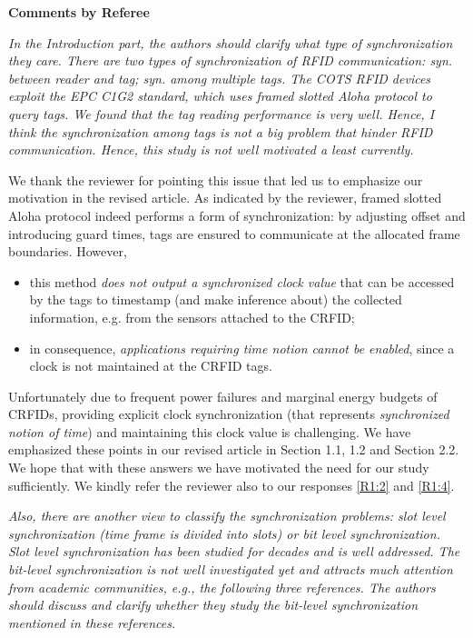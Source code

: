 \documentclass[10pt]{article}
\newcommand{\referee}[1]{
	{\item \color{OliveGreen} \emph{{#1}}}
	\label{R\therefereeCounter:\arabic{enumi}}
}
\newcommand{\response}[1]{{\color{blue} #1}}
\newcounter{refereeCounter}
\newenvironment{responses}{%
\refstepcounter{refereeCounter}%
\textbf{\large Comments by Referee \therefereeCounter}
\begin{enumerate}%
\renewcommand{\labelenumi}{\textbf{[R\therefereeCounter :\,\arabic{enumi}]}} %
}{\end{enumerate}}
\begin{document}
\begin{responses}
 
\referee{In the Introduction part, the authors should clarify what type of synchronization they care. There are two types of synchronization of RFID communication: syn. between reader and tag; syn. among multiple tags. The COTS RFID devices exploit the EPC C1G2 standard, which uses framed slotted Aloha protocol to query tags. We found that the tag reading performance is very well. Hence, I think the synchronization among tags is not a big problem that hinder RFID communication. Hence, this study is not well motivated a least currently.}

\response{We thank the reviewer for pointing this issue that led us to emphasize our motivation in the revised article. As indicated by the reviewer, framed slotted Aloha protocol indeed performs a form of synchronization: by adjusting offset and introducing guard times, tags are ensured to communicate at the allocated frame boundaries. However, 

\begin{itemize}
	\item this method \emph{does not output a synchronized clock value} that can be accessed by the tags to timestamp (and make inference about) the collected information, e.g. from the sensors attached to the CRFID;
	\item in consequence, \emph{applications requiring time notion cannot be enabled}, since a clock is not maintained at the CRFID tags.
\end{itemize}

Unfortunately due to frequent power failures and marginal energy budgets of CRFIDs, providing explicit clock synchronization (that represents \emph{synchronized notion of time}) and maintaining this clock value is challenging. We have emphasized these points in our revised article in Section 1.1, 1.2 and Section 2.2. We hope that with these answers we have motivated the need for our study sufficiently. We kindly refer the reviewer also to our responses \hyperref[R1:2]{[R1:2]} and \hyperref[R1:4]{[R1:4]}.}

\referee{Also, there are another view to classify the synchronization problems: slot level synchronization (time frame is divided into slots) or bit level synchronization. Slot level synchronization has been studied for decades and is well addressed. The bit-level synchronization is not well investigated yet and attracts much attention from academic communities, e.g., the following three references. The authors should discuss and clarify whether they study the bit-level synchronization mentioned in these references.}


\end{responses}
\end{document}
